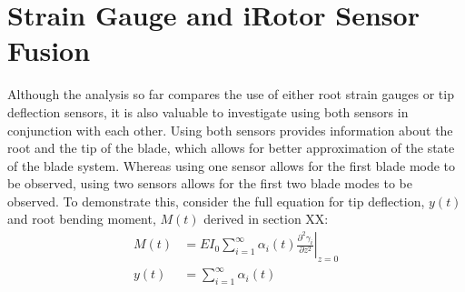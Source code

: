 \section{Strain Gauge and iRotor Sensor Fusion}
Although the analysis so far compares the use of either root strain gauges or tip deflection sensors, it is also valuable to investigate using both sensors in conjunction with each other. Using both sensors provides information about the root and the tip of the blade, which allows for better approximation of the state of the blade system. Whereas using one sensor allows for the first blade mode to be observed, using two sensors allows for the first two blade modes to be observed. To demonstrate this, consider the full equation for tip deflection, $y(t)$ and root bending moment, $M(t)$ derived in section XX:
\begin{align}
    M(t) &= EI_0\sum_{i=1}^\infty \alpha_i(t) \left.\frac{\partial ^2 \gamma_i}{\partial z^2}\right\vert_{z=0}\\
    y(t) &= \sum_{i=1}^\infty \alpha_i(t)
\end{align}


